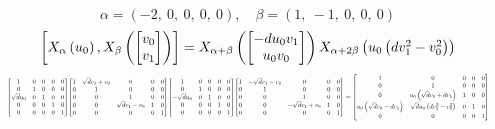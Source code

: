 \documentclass[11pt]{article}
\theoremstyle{definition}
\begin{document}
\providecommand{\scaletoalign}[2]{%
  \sbox0{$#2$}%
  \ifdim\wd0>#1\relax 
    \resizebox{#1}{!}{\usebox0}%
  \else 
    \usebox0%
  \fi 
}
\[
\alpha = \left( -2, \  0, \  0, \  0, \  0\right), \quad \beta = \left( 1, \  -1, \  0, \  0, \  0\right)
\]
\[
\scaletoalign{\textwidth}{\left[ X_{\alpha}\left(u_{0}\right), X_{\beta}\left(\left[\begin{matrix}v_{0}\\v_{1}\end{matrix}\right]\right) \right] = X_{\alpha + \beta}\left(\left[\begin{matrix}- d u_{0} v_{1}\\u_{0} v_{0}\end{matrix}\right]\right) X_{\alpha + 2\beta}\left(u_{0} \left(d v_{1}^{2} - v_{0}^{2}\right)\right)}
\]
\[
\scaletoalign{\textwidth}{{\left[\begin{matrix}1 & 0 & 0 & 0 & 0\\0 & 1 & 0 & 0 & 0\\\sqrt{d} u_{0} & 0 & 1 & 0 & 0\\0 & 0 & 0 & 1 & 0\\0 & 0 & 0 & 0 & 1\end{matrix}\right]} {\left[\begin{matrix}1 & \sqrt{d} v_{1} + v_{0} & 0 & 0 & 0\\0 & 1 & 0 & 0 & 0\\0 & 0 & 1 & 0 & 0\\0 & 0 & \sqrt{d} v_{1} - v_{0} & 1 & 0\\0 & 0 & 0 & 0 & 1\end{matrix}\right]} {\left[\begin{matrix}1 & 0 & 0 & 0 & 0\\0 & 1 & 0 & 0 & 0\\- \sqrt{d} u_{0} & 0 & 1 & 0 & 0\\0 & 0 & 0 & 1 & 0\\0 & 0 & 0 & 0 & 1\end{matrix}\right]} {\left[\begin{matrix}1 & - \sqrt{d} v_{1} - v_{0} & 0 & 0 & 0\\0 & 1 & 0 & 0 & 0\\0 & 0 & 1 & 0 & 0\\0 & 0 & - \sqrt{d} v_{1} + v_{0} & 1 & 0\\0 & 0 & 0 & 0 & 1\end{matrix}\right]} = {\left[\begin{matrix}1 & 0 & 0 & 0 & 0\\0 & 1 & 0 & 0 & 0\\0 & u_{0} \left(\sqrt{d} v_{0} + d v_{1}\right) & 1 & 0 & 0\\u_{0} \left(\sqrt{d} v_{0} - d v_{1}\right) & \sqrt{d} u_{0} \left(d v_{1}^{2} - v_{0}^{2}\right) & 0 & 1 & 0\\0 & 0 & 0 & 0 & 1\end{matrix}\right]}}
\]
\end{document}
